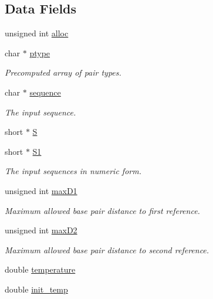 \subsection*{Data Fields}
\begin{DoxyCompactItemize}
\item 
unsigned int \mbox{\hyperlink{struct_two_dpfold__vars_a0821fddd5fe7892cd86933b506d2822e}{alloc}}
\item 
char $\ast$ \mbox{\hyperlink{struct_two_dpfold__vars_a67f37b8901b8d0a049c216d4c6241b07}{ptype}}
\begin{DoxyCompactList}\small\item\em Precomputed array of pair types. \end{DoxyCompactList}\item 
char $\ast$ \mbox{\hyperlink{struct_two_dpfold__vars_a32c15a1e31856588259556c9020f32c6}{sequence}}
\begin{DoxyCompactList}\small\item\em The input sequence. \end{DoxyCompactList}\item 
short $\ast$ \mbox{\hyperlink{struct_two_dpfold__vars_aa71adc5ac2f9b4c538024500222f9f3d}{S}}
\item 
short $\ast$ \mbox{\hyperlink{struct_two_dpfold__vars_a240311ae1e8e121441651d6101e187ac}{S1}}
\begin{DoxyCompactList}\small\item\em The input sequences in numeric form. \end{DoxyCompactList}\item 
unsigned int \mbox{\hyperlink{struct_two_dpfold__vars_a7292b6cbc1ee5bacf55e842f316c4bef}{max\+D1}}
\begin{DoxyCompactList}\small\item\em Maximum allowed base pair distance to first reference. \end{DoxyCompactList}\item 
unsigned int \mbox{\hyperlink{struct_two_dpfold__vars_a8900622d91454d2d037242e290e42834}{max\+D2}}
\begin{DoxyCompactList}\small\item\em Maximum allowed base pair distance to second reference. \end{DoxyCompactList}\item 
double \mbox{\hyperlink{struct_two_dpfold__vars_a77da404c38e4609a8635a33f00d54eca}{temperature}}
\item 
double \mbox{\hyperlink{struct_two_dpfold__vars_aa63eb4185fd5e35b3ce3a1c46c44124b}{init\+\_\+temp}}

\end{DoxyCompactItemize}

